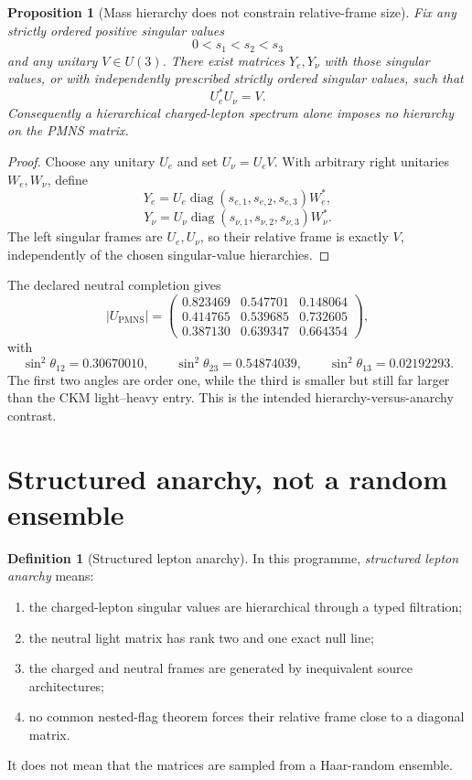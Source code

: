 \documentclass[11pt,oneside,openany]{book}
\numberwithin{equation}{chapter}
\newtheorem{proposition}[theorem]{Proposition}
\theoremstyle{definition}
\newtheorem{definition}[theorem]{Definition}
\theoremstyle{remark}
\newcommand{\diag}{\operatorname{diag}}
\newcommand{\PMNS}{\mathrm{PMNS}}
\begin{document}
\begin{proposition}[Mass hierarchy does not constrain relative-frame size]
\label{prop:mass-hierarchy-not-mixing}
Fix any strictly ordered positive singular values
\[
 0<s_1<s_2<s_3
\]
and any unitary \(V\in U(3)\).  There exist matrices \(Y_e,Y_\nu\) with those
singular values, or with independently prescribed strictly ordered
singular values, such that
\[
 U_e^*U_\nu=V.
\]
Consequently a hierarchical charged-lepton spectrum alone imposes no
hierarchy on the PMNS matrix.
\end{proposition}

\begin{proof}
Choose any unitary \(U_e\) and set \(U_\nu=U_eV\).  With arbitrary right
unitaries \(W_e,W_\nu\), define
\[
 Y_e
 =U_e\diag(s_{e,1},s_{e,2},s_{e,3})W_e^*,
\]
\[
 Y_\nu
 =U_\nu\diag(s_{\nu,1},s_{\nu,2},s_{\nu,3})W_\nu^*.
\]
The left singular frames are \(U_e,U_\nu\), so their relative frame is
exactly \(V\), independently of the chosen singular-value hierarchies.
\end{proof}

The declared neutral completion gives
\[
 |U_{\PMNS}|
 =
 \begin{pmatrix}
 0.823469&0.547701&0.148064\\
 0.414765&0.539685&0.732605\\
 0.387130&0.639347&0.664354
 \end{pmatrix},
\]
with
\[
 \sin^2\theta_{12}=0.30670010,
 \qquad
 \sin^2\theta_{23}=0.54874039,
 \qquad
 \sin^2\theta_{13}=0.02192293.
\]
The first two angles are order one, while the third is smaller but still
far larger than the CKM light--heavy entry.  This is the intended
hierarchy-versus-anarchy contrast.

\section{Structured anarchy, not a random ensemble}

\begin{definition}[Structured lepton anarchy]
In this programme, \emph{structured lepton anarchy} means:
\begin{enumerate}[label=\textup{(\roman*)},leftmargin=2.2em]
\item the charged-lepton singular values are hierarchical through a
      typed filtration;
\item the neutral light matrix has rank two and one exact null line;
\item the charged and neutral frames are generated by inequivalent
      source architectures;
\item no common nested-flag theorem forces their relative frame close to
      a diagonal matrix.
\end{enumerate}
It does not mean that the matrices are sampled from a Haar-random ensemble.
\end{definition}
\end{document}
